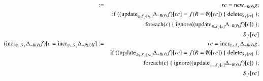 \documentclass{article}
\begin{document}
\begin{figure*}
\begin{eqnarray}
&:=&
rc = \mathrm{new}_{-R(\vec{r})} g;
\\
\nonumber &&
\mbox{if ($(\mathrm{update}_{\oplus, S_f[rc]} \Delta_{-R(\vec{r})} f)[rc] = f(R = \emptyset)[rc]$)}
\; \{ \; \mathrm{delete}_{S_f[rc]} \; \};
\\
\nonumber &&
\mathrm{foreach}(c) \; \{ \; \mathrm{ignore}((\mathrm{update}_{\oplus, S_f[c]}\Delta_{-R(\vec{r})} f)[c]) \; \};
\\
\nonumber && S_f[rc]
\\
\label{eq:md7}
(\mathrm{incr}_{\oplus_1, S_f} \Delta_{-R(\vec{r})} f)[c = \mathrm{incr}_{\oplus_2,S_g} \Delta_{-R(\vec{r})} g]
&:=&
rc = \mathrm{incr}_{\oplus_2, S_g} \Delta_{-R(\vec{r})} g;
\\
\nonumber &&
\mbox{if ($(\mathrm{update}_{\oplus_1, S_f[rc]} \Delta_{-R(\vec{r})} f)[rc] = f(R = \emptyset)[rc]$)}
\; \{ \; \mathrm{delete}_{S_f[rc]} \; \};
\\
\nonumber &&
\mathrm{foreach}(c) \; \{ \; \mathrm{ignore}((\mathrm{update}_{\oplus_1, S_f[c]}\Delta_{-R(\vec{r})} f)[c]) \; \};
\\
\nonumber && S_f[rc]
\end{eqnarray}
\end{figure*}
\end{document}
